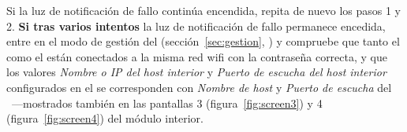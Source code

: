 \begin{enumeratecompact}
\begin{itemizecompact}
\item Si la luz de notificación de fallo  continúa encendida, repita de nuevo los pasos 1 y 2. \textbf{\color{main}Si tras varios intentos} la luz de notificación de fallo  permanece encedida, entre en el modo de gestión del \ME (sección~\ref{sec:gestion}, ) y compruebe que tanto el \MI como el \ME están conectados a la misma red wifi con la contraseña correcta, y que los valores \emph{Nombre o IP del host interior} y \emph{Puerto de escucha del host interior} configurados en el \ME se corresponden con \emph{Nombre de host} y \emph{Puerto de escucha} del \MI~---mostrados también en las pantallas 3 (figura~\ref{fig:screen3}) y 4 (figura~\ref{fig:screen4}) del módulo interior.

\end{itemizecompact}

\end{enumeratecompact}

\attend



\cleardoublepage

